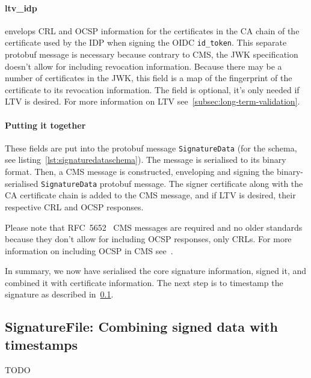 \paragraph{ltv\_idp} envelops \gls{CRL} and \gls{OCSP} information for the certificates in the \gls{CA} chain of the certificate used by the \gls{IDP} when signing the \gls{OIDC} \texttt{id\_token}.
This separate protobuf message is necessary because contrary to \gls{CMS}, the \gls{JWK} specification~\cite{rfc7517} doesn't allow for including revocation information.
Because there may be a number of certificates in the \gls{JWK}, this field is a map of the fingerprint of the certificate to its revocation information.
The field is optional, it's only needed if \gls{LTV} is desired.
For more information on \gls{LTV} see~\ref{subsec:long-term-validation}.

\paragraph{Putting it together}

These fields are put into the protobuf message \texttt{SignatureData} (for the schema, see listing~\ref{lst:signaturedataschema}).
The message is serialised to its binary format.
Then, a \gls{CMS} message is constructed, enveloping and signing the binary-serialised \texttt{SignatureData} protobuf message.
The signer certificate along with the \gls{CA} certificate chain is added to the \gls{CMS} message, and if \gls{LTV} is desired,
their respective \gls{CRL} and \gls{OCSP} responses.

Please note that RFC~5652~\cite{rfc5652} \gls{CMS} messages are required and no older standards
because they don't allow for including \gls{OCSP} responses, only \gls{CRL}s.
For more information on including \gls{OCSP} in \gls{CMS} see~\cite[Section 10.2.1, RevocationInfoChoices and OtherRevocationInfoFormat]{rfc5652}.

In summary, we now have serialised the core signature information, signed it, and combined it with certificate information.
The next step is to timestamp the signature as described in~\ref{subsec:signaturefile:-combining-signed-data-with-timestamps}.

\subsection{SignatureFile: Combining signed data with timestamps}\label{subsec:signaturefile:-combining-signed-data-with-timestamps}
TODO




